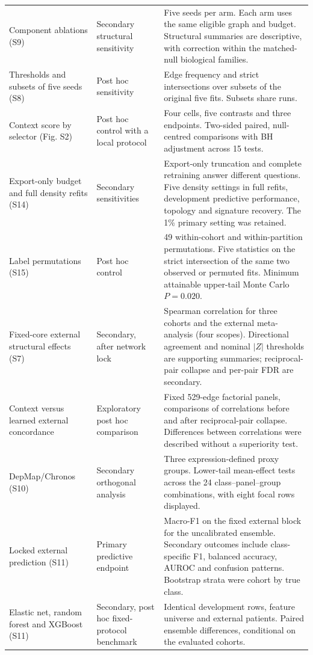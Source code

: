 \begin{longtable}{@{}p{.245\linewidth}p{.225\linewidth}p{.475\linewidth}@{}}
Component ablations (S9) & Secondary structural sensitivity & Five seeds per arm. Each arm uses the same eligible graph and budget. Structural summaries are descriptive, with correction within the matched-null biological families.\\
Thresholds and subsets of five seeds (S8) & Post hoc sensitivity & Edge frequency and strict intersections over subsets of the original five fits. Subsets share runs.\\
Context score by selector (Fig. S2) & Post hoc control with a local protocol & Four cells, five contrasts and three endpoints. Two-sided paired, null-centred comparisons with BH adjustment across 15 tests.\\
Export-only budget and full density refits (S14) & Secondary sensitivities & Export-only truncation and complete retraining answer different questions. Five density settings in full refits, development predictive performance, topology and signature recovery. The 1\% primary setting was retained.\\
Label permutations (S15) & Post hoc control & 49 within-cohort and within-partition permutations. Five statistics on the strict intersection of the same two observed or permuted fits. Minimum attainable upper-tail Monte Carlo $P=0.020$.\\
Fixed-core external structural effects (S7) & Secondary, after network lock & Spearman correlation for three cohorts and the external meta-analysis (four scopes). Directional agreement and nominal $|Z|$ thresholds are supporting summaries; reciprocal-pair collapse and per-pair FDR are secondary.\\
Context versus learned external concordance & Exploratory post hoc comparison & Fixed 529-edge factorial panels, comparisons of correlations before and after reciprocal-pair collapse. Differences between correlations were described without a superiority test.\\
DepMap/Chronos (S10) & Secondary orthogonal analysis & Three expression-defined proxy groups. Lower-tail mean-effect tests across the 24 class--panel--group combinations, with eight focal rows displayed.\\
Locked external prediction (S11) & Primary predictive endpoint & Macro-F1 on the fixed external block for the uncalibrated ensemble. Secondary outcomes include class-specific F1, balanced accuracy, AUROC and confusion patterns. Bootstrap strata were cohort by true class.\\
Elastic net, random forest and XGBoost (S11) & Secondary, post hoc fixed-protocol benchmark & Identical development rows, feature universe and external patients. Paired ensemble differences, conditional on the evaluated cohorts.\\

\end{longtable}
